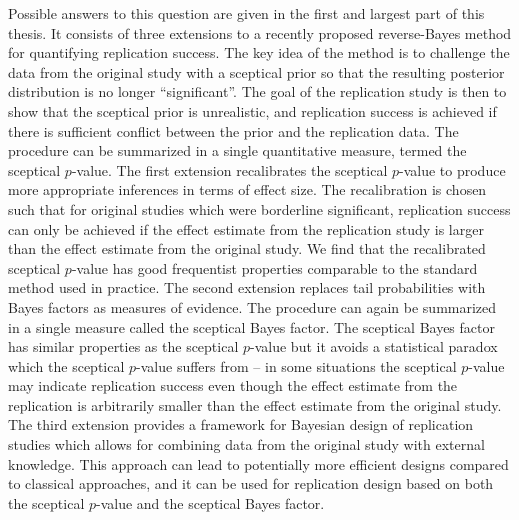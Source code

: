 Possible answers to this question are given in the first and largest part of
this thesis. It consists of three extensions to a recently proposed
reverse-Bayes method for quantifying replication success. The key idea of the
method is to challenge the data from the original study with a sceptical prior
so that the resulting posterior distribution is no longer ``significant''. The
goal of the replication study is then to show that the sceptical prior is
unrealistic, and replication success is achieved if there is sufficient conflict
between the prior and the replication data. The procedure can be summarized in a
single quantitative measure, termed the sceptical $p$-value.
The first extension recalibrates the sceptical $p$-value to produce more
appropriate inferences in terms of effect size. The recalibration is chosen such
that for original studies which were borderline significant, replication success
can only be achieved if the effect estimate from the replication study is larger
than the effect estimate from the original study. We find that the recalibrated
sceptical $p$-value has good frequentist properties comparable to the standard
method used in practice.
The second extension replaces tail probabilities with Bayes factors as measures
of evidence. The procedure can again be summarized in a single measure called
the sceptical Bayes factor.
The sceptical Bayes factor has similar properties as the sceptical $p$-value but
it avoids a statistical paradox which the sceptical $p$-value suffers from -- in
some situations the sceptical $p$-value may indicate replication success even
though the effect estimate from the replication is arbitrarily smaller than the
effect estimate from the original
study. %
The third extension provides a framework for Bayesian design of replication
studies which allows for combining data from the original study with external
knowledge. This approach can lead to potentially more efficient designs compared
to classical approaches, and it can be used for replication design based on both
the sceptical $p$-value and the sceptical Bayes factor.

